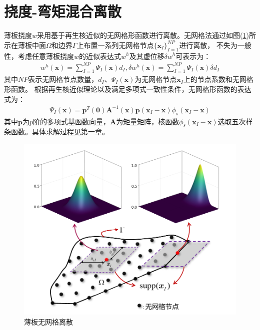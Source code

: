 \section{挠度-弯矩混合离散}
薄板挠度$w$采用基于再生核近似的无网格形函数进行离散。无网格法通过如图(\ref{PPSI})所示在薄板中面$\Omega$和边界$\Gamma$上布置一系列无网格节点$\{\pmb{x}_I\}^{N\!P}_{I=1}$进行离散，
不失为一般性，考虑任意薄板挠度$w$的近似表达式$w^h$及其虚位移$\delta w^h$可表示为：
\begin{equation}\label{w}
\begin{split}
    w^h(\pmb{x})=\sum_{I=1}^{N\!P}\Psi_I(\pmb{x})d_{I},\delta w^h(\pmb{x})=\sum_{I=1}^{N\!P}\Psi_I(\pmb{x})\delta d_I
\end{split}
\end{equation}
其中$N\!P$表示无网格节点数量，$d_I$、$\Psi_I(\pmb{x})$为无网格节点$\pmb{x}_I$上的节点系数和无网格形函数。
根据再生核近似理论\cite{}以及满足多项式一致性条件，无网格形函数的表达式为：
\begin{equation}
\begin{split}
    \Psi_I(\pmb{x})=\pmb{p}^T(\pmb{0})\pmb{A}^{-1}(\pmb{x})\pmb{p}(\pmb{x}_I-\pmb{x})\phi_s(\pmb{x}_I-\pmb{x})
\end{split}
\end{equation}
其中$\pmb{p}$为$p$阶的多项式基函数向量，$\pmb{A}$为矩量矩阵，核函数$\phi_s(\pmb{x}_I-\pmb{x})$选取五次样条函数。具体求解过程见第一章。\par
\begin{figure}[H]
    \centering
    \includegraphics[scale=0.6]{figure/PHR/PSI.png}
    \caption{薄板无网格离散}\label{PPSI}
\end{figure}
